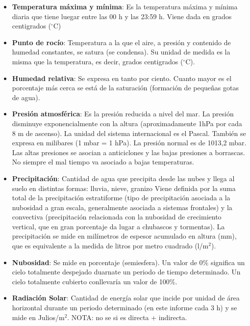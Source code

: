 \documentclass[[a4paper,landscape]{article}\usepackage[]{graphicx}\usepackage[]{color}
\begin{document}
\begin{itemize}
    \item \textbf{Temperatura m\'axima y m\'inima}: Es la temperatura máxima y mínima diaria que tiene luegar entre las 00 h y las 23:59 h.
     Viene dada en grados centigrados ($^\circ$C)

     \item \textbf{Punto de roc\'io}: Temperatura a la que el aire, a presi\'on y contenido de humedad constantes,
     se satura (se condensa).  Su unidad de medida es la misma que la temperatura, es decir,
     grados centigrados ($^\circ$C).

     \item \textbf{Humedad relativa}: Se expresa en tanto por ciento.
     Cuanto mayor es el porcentaje más cerca se está de la saturación (formación de pequeñas gotas de agua).

    \item \textbf{Presi\'on atmosf\'erica}: Es la presión reducida a nivel del mar.
    La presión disminuye exponencialmente con la altura (aproximadamente 1hPa por cada 8 m de ascenso).
    La unidad del sistema internacional es el Pascal. También se expresa en milibares (1 mbar = 1 hPa). La presi\'on normal es de 1013,2 mbar.
    Las altas presiones se asocian a anticiclones y las bajas presiones a borrascas. No siempre el mal tiempo va asociado a bajas temperaturas.

    \item \textbf{Precipitaci\'on}: Cantidad de agua que precipita desde las nubes y llega al suelo en distintas formas: lluvia, nieve,  granizo
    Viene definida por la suma total de la precipitaci\'on estratiforme
    (tipo de precipitaci\'on asociada a la nubosidad a gran escala, generalmente asociada a sistemas frontales)
    y la convectiva (precipitaci\'on relacionada con la nubosidad de crecimiento vertical, que en gran porcentaje da lugar a chubascos y tormentas).
    La precipitaci\'on se mide en mil\'imetros de espesor acumulado en altura (mm),
    que es equivalente a la medida de litros por metro cuadrado (l/m$^2$).\\

    \item \textbf{Nubosidad}: Se mide en porcentaje (semiesfera).
    Un valor de 0\% significa un cielo totalmente despejado duarnate un periodo de tiempo determinado.
    Un cielo totalmente cubierto conllevaría un valor de 100\%.

    \item \textbf{Radiaci\'on Solar}: Cantidad de energía solar que incide por unidad de área horizontal durante un periodo determinado (en este informe cada 3 h)
    y se mide en Julios/m$^2$. NOTA: no se si es directa + indirecta.


\end{itemize}
\end{document}
